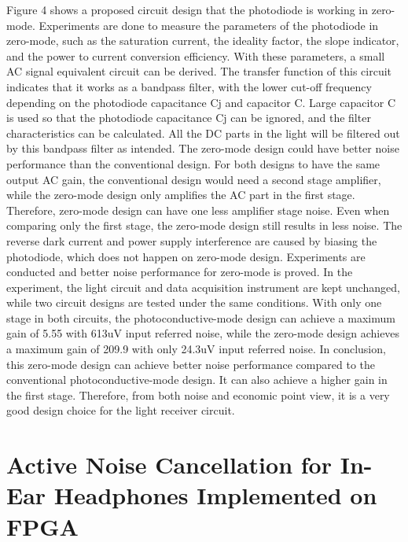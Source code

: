 Figure 4 shows a proposed circuit design that the photodiode is working in zero-mode.  Experiments are done to measure the parameters of the photodiode in zero-mode, such as the saturation current, the ideality factor, the slope indicator, and the power to current conversion efficiency.  With these parameters, a small AC signal equivalent circuit can be derived.  The transfer function of this circuit indicates that it works as a bandpass filter, with the lower cut-off frequency depending on the photodiode capacitance Cj and capacitor C.  Large capacitor C is used so that the photodiode capacitance Cj can be ignored, and the filter characteristics can be calculated.  All the DC parts in the light will be filtered out by this bandpass filter as intended.
The zero-mode design could have better noise performance than the conventional design.  For both designs to have the same output AC gain, the conventional design would need a second stage amplifier, while the zero-mode design only amplifies the AC part in the first stage.  Therefore, zero-mode design can have one less amplifier stage noise.  Even when comparing only the first stage, the zero-mode design still results in less noise.  The reverse dark current and power supply interference are caused by biasing the photodiode, which does not happen on zero-mode design.  Experiments are conducted and better noise performance for zero-mode is proved.
In the experiment, the light circuit and data acquisition instrument are kept unchanged, while two circuit designs are tested under the same conditions.  With only one stage in both circuits, the photoconductive-mode design can achieve a maximum gain of 5.55 with 613uV input referred noise, while the zero-mode design achieves a maximum gain of 209.9 with only 24.3uV input referred noise.
In conclusion, this zero-mode design can achieve better noise performance compared to the conventional photoconductive-mode design.  It can also achieve a higher gain in the first stage.  Therefore, from both noise and economic point view, it is a very good design choice for the light receiver circuit.

\section{Active Noise Cancellation for In-Ear Headphones Implemented on FPGA}


